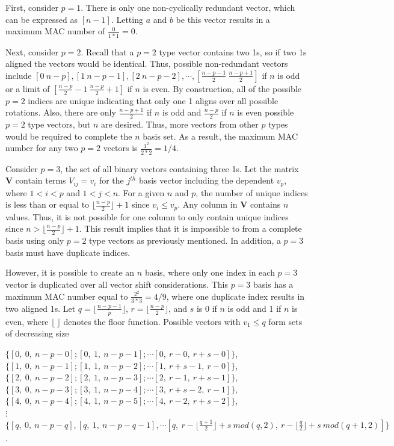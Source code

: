 \documentclass[3p,times]{elsarticle}
\begin{document}
First, consider $p=1$.  There is only one non-cyclically redundant vector, which can be expressed as $\left[n-1\right]$.  
Letting $a$ and $b$ be this vector results in a maximum MAC number of $\frac{0}{1*1}=0$.

Next, consider $p=2$.  Recall that a $p=2$ type vector contains two 1s, so if two 1s aligned the vectors would be identical.  
Thus, possible non-redundant vectors include $[0\ n-p], [1\  n-p-1], [2\ n-p-2], \cdots, [\frac{n-p-1}{2}\ \frac{n-p+1}{2}]$ if $n$ is odd or a limit of $[\frac{n-p}{2}-1\ \frac{n-p}{2}+1]$ if $n$ is even.  By construction, all of the possible $p=2$ indices are unique indicating that only one 1 aligns over all possible rotations.  
Also, there are only $\frac{n-p+1}{2}$ if $n$ is odd and $\frac{n-p}{2}$ if $n$ is even possible $p=2$ type vectors, but $n$ are desired.  
Thus, more vectors from other $p$ types would be required to complete the $n$ basis set.    
As a result, the maximum MAC number for any two $p=2$ vectors is $\frac{1^2}{2*2}=1/4$.

Consider $p=3$, the set of all binary vectors containing three 1s.  
Let the matrix $\textbf{V}$ contain terms $V_{ij}=v_i$ for the $j^{th}$ basis vector including the dependent $v_p$, where $1<i<p$ and $1<j<n$.
For a given $n$ and $p$, the number of unique indices is less than or equal to $\lfloor \frac{n-p}{2}\rfloor+1$ since $v_i\le v_p$.  
Any column in $\textbf{V}$ contains $n$ values.  Thus, it is not possible for one column to only contain unique indices since $n>\lfloor \frac{n-p}{2}\rfloor+1$.
This result implies that it is impossible to from a complete basis using only $p=2$ type vectors as previously mentioned.  In addition, a $p=3$ basis must have
duplicate indices.

However, it is possible to create an $n$ basis, where only one index in each $p=3$ vector is duplicated over all vector shift considerations.  
This $p=3$ basis has a maximum MAC number equal to $\frac{2^2}{3*3}=4/9$, where one duplicate index results in two aligned 1s.
Let $q=\lfloor\frac{n-p-1}{p}\rfloor$, $r=\lfloor\frac{n-p}{2}\rfloor$, and $s$ is 0 if $n$ is odd and 1 if $n$ is even, where $\lfloor\ \rfloor$ denotes the floor function.
Possible vectors with $v_1\le q$ form sets of decreasing size

\begin{center}
$\{[0,\ 0,\ n-p-0]; [0,\ 1,\ n-p-1]; \cdots [0,\ r-0,\ r+s-0]\}$,\\
$\{[1,\ 0,\ n-p-1]; [1,\ 1,\ n-p-2]; \cdots [1,\ r+s-1,\ r-0]\}$,\\
$\{[2,\ 0,\ n-p-2]; [2,\ 1,\ n-p-3]; \cdots [2,\ r-1,\ r+s-1]\}$,\\
$\{[3,\ 0,\ n-p-3]; [3,\ 1,\ n-p-4]; \cdots [3,\ r+s-2,\ r-1]\}$,\\
$\{[4,\ 0,\ n-p-4]; [4,\ 1,\ n-p-5]; \cdots [4,\ r-2,\ r+s-2]\}$,\\
$\vdots$ \\
$\{[q,\ 0,\ n-p-q], [q,\ 1,\ n-p-q-1], \cdots [q,\ r-\lfloor \frac{q+1}{2}\rfloor+s\ mod(q,2),\ r-\lfloor \frac{q}{2}\rfloor+s\ mod(q+1,2)]\}$.
\end{center}
\end{document}
